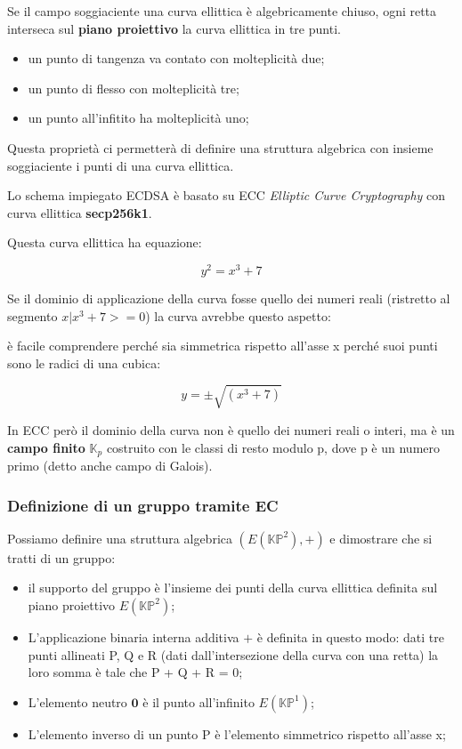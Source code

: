 \documentclass{book}
\theoremstyle{definition}
\begin{document}
Se il campo soggiaciente una curva ellittica è algebricamente chiuso, ogni retta interseca sul \textbf{piano proiettivo} la curva ellittica in tre punti.

\begin{itemize}
    \item un punto di tangenza va contato con molteplicità due;
    \item un punto di flesso con molteplicità tre;
    \item un punto all'infitito ha molteplicità uno;
\end{itemize}

Questa proprietà ci permetterà di definire una struttura algebrica con insieme soggiaciente i punti di una curva ellittica.

Lo schema impiegato ECDSA è basato su ECC \textit{Elliptic Curve Cryptography} con curva ellittica \textbf{secp256k1}.

Questa curva ellittica ha equazione:

\begin{equation}
    y^2 = x^3 + 7
\end{equation}

Se il dominio di applicazione della curva fosse quello dei numeri reali (ristretto al segmento $x | x^3 + 7 >= 0$) la curva avrebbe questo aspetto:

è facile comprendere perché sia simmetrica rispetto all'asse x perché suoi punti sono le radici di una cubica:

\begin{equation*}
    y = \pm \sqrt{(x^3+7)}
\end{equation*}

In ECC però il dominio della curva non è quello dei numeri reali o interi, ma è un \textbf{campo finito} $\mathbb{K}_{p}$ costruito con le classi di resto modulo p, dove p è un numero primo (detto anche campo di Galois).

\subsubsection{Definizione di un gruppo tramite EC}

Possiamo definire una struttura algebrica $(E(\mathbb{KP}^2), +)$ e dimostrare che si tratti di un gruppo:

\begin{itemize}
    \item il supporto del gruppo è l'insieme dei punti della curva ellittica definita sul piano proiettivo $E(\mathbb{KP}^2)$;
    \item L'applicazione binaria interna additiva $+$ è definita in questo modo: dati tre punti allineati P, Q e R (dati dall'intersezione della curva con una retta) la loro somma è tale che P + Q + R = 0;
    \item L'elemento neutro $\mathbf{0}$ è il punto all'infinito ${E(\mathbb{KP}^{1})}$;
    \item L'elemento inverso di un punto P è l'elemento simmetrico rispetto all'asse x;
\end{itemize}
\end{document}
